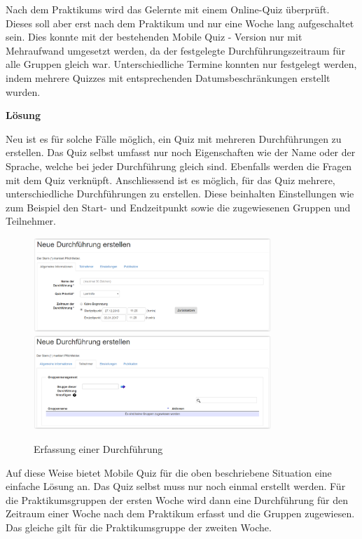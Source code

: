 Nach dem Praktikums wird das Gelernte mit einem Online-Quiz überprüft. Dieses soll aber erst nach dem Praktikum und nur eine Woche lang aufgeschaltet sein. Dies konnte mit der bestehenden Mobile Quiz - Version nur mit Mehraufwand umgesetzt werden, da der festgelegte Durchführungszeitraum für alle Gruppen gleich war. Unterschiedliche Termine konnten nur festgelegt werden, indem mehrere Quizzes mit entsprechenden Datumsbeschränkungen erstellt wurden.

\bigskip\bigskip

\textbf{Lösung}
\bigskip

Neu ist es für solche Fälle möglich, ein Quiz mit mehreren Durchführungen zu erstellen. Das Quiz selbst umfasst nur noch Eigenschaften wie der Name oder der Sprache, welche bei jeder Durchführung gleich sind. Ebenfalls werden die Fragen mit dem Quiz verknüpft. Anschliessend ist es möglich, für das Quiz mehrere, unterschiedliche Durchführungen zu erstellen. Diese beinhalten Einstellungen wie zum Beispiel den Start- und Endzeitpunkt sowie die zugewiesenen Gruppen und Teilnehmer.


\begin{figure}[H]
	\centering
	\includegraphics[width=0.8\textwidth]{Images/Quiz_Durchfuehrung1.PNG}
	\includegraphics[width=0.8\textwidth]{Images/Quiz_Durchfuehrung2.PNG}
	\caption{Erfassung einer Durchführung}
\end{figure}


Auf diese Weise bietet Mobile Quiz für die oben beschriebene Situation eine einfache Lösung an. Das Quiz selbst muss nur noch einmal erstellt werden. Für die Praktikumsgruppen der ersten Woche wird dann eine Durchführung für den Zeitraum einer Woche nach dem Praktikum erfasst und die Gruppen zugewiesen. Das gleiche gilt für die Praktikumsgruppe der zweiten Woche. \\

